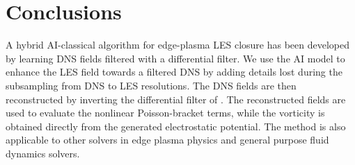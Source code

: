 \documentclass[authoryear,preprint,review,12pt]{elsarticle}
\begin{document}


%
%
%
%
%
%
%
\section{Conclusions}\label{sec:Conclusions}

A hybrid AI-classical algorithm for edge-plasma LES closure has been developed by learning DNS fields filtered with a differential filter. We use the AI model to enhance the LES field towards a filtered DNS by adding details lost during the subsampling from DNS to LES resolutions. The DNS fields are then reconstructed by inverting the differential filter of \citet{germano_differential_1986}. The reconstructed fields are used to evaluate the nonlinear Poisson-bracket terms, while the vorticity is obtained directly from the generated electrostatic potential. The method is also applicable to other solvers in edge plasma physics and general purpose fluid dynamics solvers.
\end{document}
